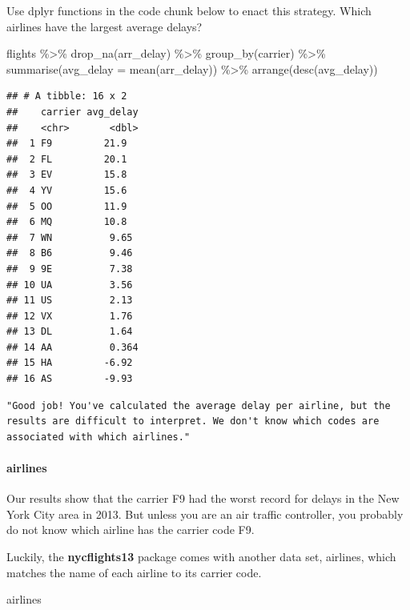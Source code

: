 \documentclass[
]{article}
\newenvironment{Shaded}{\begin{snugshade}}{\end{snugshade}}
\newcommand{\AttributeTok}[1]{\textcolor[rgb]{0.77,0.63,0.00}{#1}}
\newcommand{\FunctionTok}[1]{\textcolor[rgb]{0.00,0.00,0.00}{#1}}
\newcommand{\NormalTok}[1]{#1}
\newcommand{\SpecialCharTok}[1]{\textcolor[rgb]{0.00,0.00,0.00}{#1}}
\begin{document}
Use dplyr functions in the code chunk below to enact this strategy.
Which airlines have the largest average delays?

\begin{Shaded}
\begin{Highlighting}[]
\NormalTok{flights }\SpecialCharTok{\%\textgreater{}\%} 
  \FunctionTok{drop\_na}\NormalTok{(arr\_delay) }\SpecialCharTok{\%\textgreater{}\%} 
  \FunctionTok{group\_by}\NormalTok{(carrier) }\SpecialCharTok{\%\textgreater{}\%}
  \FunctionTok{summarise}\NormalTok{(}\AttributeTok{avg\_delay =} \FunctionTok{mean}\NormalTok{(arr\_delay)) }\SpecialCharTok{\%\textgreater{}\%}
  \FunctionTok{arrange}\NormalTok{(}\FunctionTok{desc}\NormalTok{(avg\_delay))}
\end{Highlighting}
\end{Shaded}

\begin{verbatim}
## # A tibble: 16 x 2
##    carrier avg_delay
##    <chr>       <dbl>
##  1 F9         21.9  
##  2 FL         20.1  
##  3 EV         15.8  
##  4 YV         15.6  
##  5 OO         11.9  
##  6 MQ         10.8  
##  7 WN          9.65 
##  8 B6          9.46 
##  9 9E          7.38 
## 10 UA          3.56 
## 11 US          2.13 
## 12 VX          1.76 
## 13 DL          1.64 
## 14 AA          0.364
## 15 HA         -6.92 
## 16 AS         -9.93
\end{verbatim}

\begin{verbatim}
"Good job! You've calculated the average delay per airline, but the results are difficult to interpret. We don't know which codes are associated with which airlines."
\end{verbatim}

\hypertarget{airlines}{%
\paragraph{airlines}\label{airlines}}

Our results show that the carrier F9 had the worst record for delays in
the New York City area in 2013. But unless you are an air traffic
controller, you probably do not know which airline has the carrier code
F9.

Luckily, the \textbf{nycflights13} package comes with another data set,
airlines, which matches the name of each airline to its carrier code.

\begin{Shaded}
\begin{Highlighting}[]
\NormalTok{airlines}
\end{Highlighting}
\end{Shaded}
\end{document}
